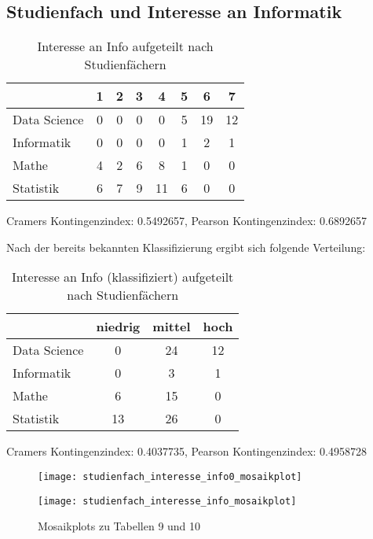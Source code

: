 \documentclass[paper=a4,                 %
               fontsize=12pt,            %
               parskip=half,             %
               ngerman,                 %
               ]{scrartcl}
\begin{document}
\newpage
\subsection{Studienfach und Interesse an Informatik}
\begin{table}[h]
\begin{center}
\begin{tabular}{l||c|c|c|c|c|c|c}
& 1 & 2 & 3 & 4 & 5 & 6 & 7 \\
\hline
Data Science & 0 & 0 & 0 & 0 & 5 &19 &12 \\
  Informatik   & 0 & 0 & 0 & 0 & 1 & 2 & 1\\
  Mathe        & 4 & 2 & 6 & 8 & 1 & 0 & 0\\
  Statistik    & 6 & 7 & 9 &11 & 6 & 0 & 0\\
\end{tabular}
\caption{Interesse an Info aufgeteilt nach Studienfächern}
Cramers Kontingenzindex:  0.5492657, Pearson Kontingenzindex:  0.6892657 
\end{center}
\end{table}
Nach der bereits bekannten Klassifizierung ergibt sich folgende Verteilung:
\begin{table}[h]
\begin{center}
\begin{tabular}{l||c|c|c}
& niedrig & mittel & hoch \\
\hline
Data Science & 0 & 24 & 12\\
Informatik  & 0 & 3 & 1 \\
Mathe     &  6 & 15 & 0  \\
Statistik     &13 & 26 & 0\\
\end{tabular}
\caption{Interesse an Info (klassifiziert) aufgeteilt nach Studienfächern}
Cramers Kontingenzindex:  0.4037735, Pearson Kontingenzindex:  0.4958728
\end{center}
\end{table}

\begin{figure}[ht]
   \begin{minipage}{.4\textwidth}
      \texttt{[image: studienfach\_interesse\_info0\_mosaikplot]}
   \end{minipage}
   \hspace{.1\linewidth}%
   \begin{minipage}{.4\textwidth} %
	\texttt{[image: studienfach\_interesse\_info\_mosaikplot]}
   \end{minipage}
   \caption{Mosaikplots zu Tabellen 9 und 10}
\end{figure}
\end{document}
